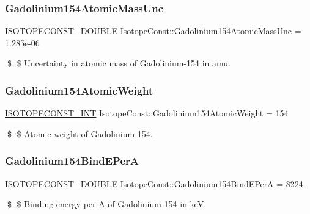 \subsubsection{\texorpdfstring{Gadolinium154\+Atomic\+Mass\+Unc}{Gadolinium154AtomicMassUnc}}
{\footnotesize\ttfamily \mbox{\hyperlink{group___isotope_const-_macros_ga8f45a7272ce02c0b4c65c44636ed719a}{I\+S\+O\+T\+O\+P\+E\+C\+O\+N\+S\+T\+\_\+\+D\+O\+U\+B\+LE}} Isotope\+Const\+::\+Gadolinium154\+Atomic\+Mass\+Unc = 1.\+285e-\/06}

\$ \$ Uncertainty in atomic mass of Gadolinium-\/154 in amu. \mbox{\label{group___isotope_const-_gadolinium-_gd154_ga7a22d6f3e6250ab78bdf47b6815646f6}} 
\subsubsection{\texorpdfstring{Gadolinium154\+Atomic\+Weight}{Gadolinium154AtomicWeight}}
{\footnotesize\ttfamily \mbox{\hyperlink{group___isotope_const-_macros_ga5f18360b3e99483a35c32d789e62621c}{I\+S\+O\+T\+O\+P\+E\+C\+O\+N\+S\+T\+\_\+\+I\+NT}} Isotope\+Const\+::\+Gadolinium154\+Atomic\+Weight = 154}

\$ \$ Atomic weight of Gadolinium-\/154. \mbox{\label{group___isotope_const-_gadolinium-_gd154_gacedc4a69afa3499172dec206e4e7039f}} 
\subsubsection{\texorpdfstring{Gadolinium154\+Bind\+E\+PerA}{Gadolinium154BindEPerA}}
{\footnotesize\ttfamily \mbox{\hyperlink{group___isotope_const-_macros_ga8f45a7272ce02c0b4c65c44636ed719a}{I\+S\+O\+T\+O\+P\+E\+C\+O\+N\+S\+T\+\_\+\+D\+O\+U\+B\+LE}} Isotope\+Const\+::\+Gadolinium154\+Bind\+E\+PerA = 8224.}

\$ \$ Binding energy per A of Gadolinium-\/154 in keV. \mbox{\label{group___isotope_const-_gadolinium-_gd154_gade39cff0d736db398b93d325c83f86ff}} 
